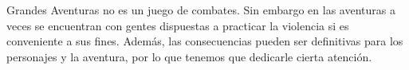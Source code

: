 
Grandes Aventuras no es un juego de combates. Sin embargo en las
aventuras a veces se encuentran con gentes dispuestas a practicar
la violencia si es conveniente a sus fines. Además, las consecuencias
pueden ser definitivas para los personajes y la aventura, por lo que
tenemos que dedicarle cierta atención.









